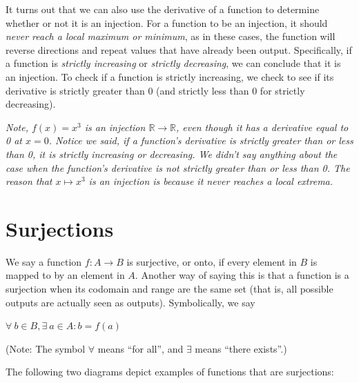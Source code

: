 \documentclass{article}
\begin{document}
It turns out that we can also use the derivative of a function to determine whether or not it is an injection. For a function to be an injection, it should \textit{never reach a local maximum or minimum}, as in these cases, the function will reverse directions and repeat values that have already been output. Specifically, if a function is \textit{strictly increasing} or \textit{strictly decreasing}, we can conclude that it is an injection. To check if a function is strictly increasing, we check to see if its derivative is strictly greater than 0 (and strictly less than 0 for strictly decreasing).

\textit{Note, $f(x) = x^3$ is an injection $\mathbb{R} \rightarrow \mathbb{R}$, even though it has a derivative equal to 0 at $x = 0$. Notice we said, if a function's derivative is strictly greater than or less than 0, it is strictly increasing or decreasing. We didn't say anything about the case when the function's derivative is not strictly greater than or less than 0. The reason that $x \mapsto x^3$ is an injection is because it never reaches a local extrema.}

\section{Surjections}
We say a function $f : A \rightarrow B$ is surjective, or onto, if every element in $B$ is mapped to by an element in $A$. Another way of saying this is that a function is a surjection when its codomain and range are the same set (that is, all possible outputs are actually seen as outputs). Symbolically, we say

\centerline{$\boxed{\forall \: b \in B, \exists \: a \in A : b = f(a)}$}

(Note: The symbol $\forall$ means “for all”, and $\exists$ means “there exists”.)

The following two diagrams depict examples of functions that are surjections:
\end{document}
